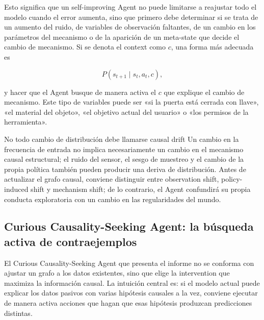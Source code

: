 

Esto significa que un self-improving Agent no puede limitarse a reajustar todo el modelo cuando el error aumenta, sino que primero debe determinar si se trata de un aumento del ruido, de variables de observación faltantes, de un cambio en los parámetros del mecanismo o de la aparición de un meta-state que decide el cambio de mecanismo. Si se denota el context como $c$, una forma más adecuada es

$$
P(s_{t+1}\mid s_t,a_t,c),
$$

y hacer que el Agent busque de manera activa el $c$ que explique el cambio de mecanismo. Este tipo de variables puede ser «si la puerta está cerrada con llave», «el material del objeto», «el objetivo actual del usuario» o «los permisos de la herramienta».

\begin{warningbox}{No todo cambio de distribución debe llamarse causal drift}
Un cambio en la frecuencia de entrada no implica necesariamente un cambio en el mecanismo causal estructural; el ruido del sensor, el sesgo de muestreo y el cambio de la propia política también pueden producir una deriva de distribución. Antes de actualizar el grafo causal, conviene distinguir entre observation shift, policy-induced shift y mechanism shift; de lo contrario, el Agent confundirá su propia conducta exploratoria con un cambio en las regularidades del mundo.
\end{warningbox}


\subsection{Curious Causality-Seeking Agent: la búsqueda activa de contraejemplos}

El Curious Causality-Seeking Agent que presenta el informe no se conforma con ajustar un grafo a los datos existentes, sino que elige la intervention que maximiza la información causal. La intuición central es: si el modelo actual puede explicar los datos pasivos con varias hipótesis causales a la vez, conviene ejecutar de manera activa acciones que hagan que esas hipótesis produzcan predicciones distintas.


